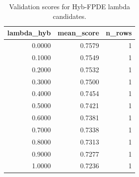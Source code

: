 \begin{table}[t]
\caption{Validation scores for Hyb-FPDE lambda candidates.}
\label{tab:lambda_distribution_computed}
\centering
\begin{tabular}{rrr}
\toprule
lambda\_hyb & mean\_score & n\_rows \\
\midrule
0.0000 & 0.7579 & 1 \\
0.1000 & 0.7549 & 1 \\
0.2000 & 0.7532 & 1 \\
0.3000 & 0.7500 & 1 \\
0.4000 & 0.7454 & 1 \\
0.5000 & 0.7421 & 1 \\
0.6000 & 0.7381 & 1 \\
0.7000 & 0.7338 & 1 \\
0.8000 & 0.7313 & 1 \\
0.9000 & 0.7277 & 1 \\
1.0000 & 0.7236 & 1 \\
\bottomrule
\end{tabular}

\end{table}
